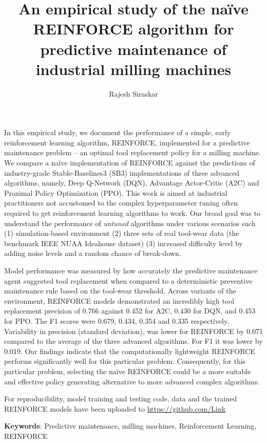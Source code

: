 \documentclass[a4paper, 12pt]{article}
\title{An empirical study of the na\"ive REINFORCE algorithm for predictive maintenance of industrial milling machines}
\author{Rajesh Siraskar}
\renewenvironment{abstract}
{\small
	\begin{center}
		\bfseries \abstractname\vspace{-.5em}\vspace{0pt}
	\end{center}
	\list{}{
		\setlength{\leftmargin}{.25cm}%
		\setlength{\rightmargin}{\leftmargin}%
	}%
	\item\relax}
{\endlist}
\begin{document}
\maketitle

\begin{abstract}
In this empirical study, we document the performance of a simple, early reinforcement learning algorithm, REINFORCE, implemented for a predictive maintenance problem -- an optimal tool replacement policy for a milling machine. We compare a na\"ive implementation of REINFORCE against the predictions of industry-grade Stable-Baselines3 (SB3) implementations of three advanced algorithms, namely, Deep Q-Network (DQN), Advantage Actor-Critic (A2C) and Proximal Policy Optimization (PPO). This work is aimed at industrial practitioners not accustomed to the complex hyperparameter tuning often required to get reinforcement learning algorithms to work. Our broad goal was to understand the performance of \textit{untuned} algorithms under various scenarios such (1) simulation-based environment (2) three sets of real tool-wear data (the benchmark IEEE NUAA Ideahouse dataset) (3) increased difficulty level by adding noise levels and a random chance of break-down. 

Model performance was measured by how accurately the predictive maintenance agent suggested tool replacement when compared to a deterministic preventive maintenance rule based on the tool-wear threshold. Across variants of the environment, REINFORCE models demonstrated an incredibly high tool replacement precision of 0.766 against 0.452 for A2C, 0.430 for DQN, and 0.453 for PPO. The F1 scores were 0.679, 0.434, 0.354 and 0.335 respectively. Variability in precision (standard deviation), was lower for REINFORCE by 0.071 compared to the average of the three advanced algorithms. For F1 it was lower by 0.019. Our findings indicate that the computationally lightweight REINFORCE performs significantly well for this particular problem. Consequently, for this particular problem, selecting the na\"ive REINFORCE could be a more suitable and effective policy generating alternative to more advanced complex algorithms. 

For reproducibility, model training and testing code, data and the trained REINFORCE models have been uploaded to \href{https://github.com/Rajesh-Siraskar/Empirical-Study\_REINFORCE-for-predictive-maintenance}{https://github.com/Link} 
\end{abstract}

\noindent \textbf{Keywords}: Predictive maintenance, milling machines, Reinforcement Learning, REINFORCE
\end{document}
